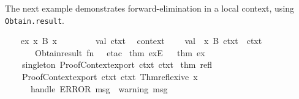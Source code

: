 \begin{isabellebody}
%
\isadelimproof
%
\endisadelimproof
%
\begin{isamarkuptext}%
\medskip The next example demonstrates forward-elimination in
  a local context, using \verb|Obtain.result|.%
\end{isamarkuptext}%
\isamarkuptrue%
\isamarkupfalse%
\isanewline
%
\isadelimproof
\ \ %
\endisadelimproof
%
\isatagproof
{}\isamarkupfalse%
\ ex{\isacharcolon}\ {\isachardoublequoteopen}{\isasymexists}x{\isachardot}\ B\ x{\isachardoublequoteclose}%
\endisatagproof
{\isafoldproof}%
%
\isadelimproof
\isanewline
%
\endisadelimproof
%
\isadelimML
\isanewline
\ \ %
\endisadelimML
%
\isatagML
{}\isamarkupfalse%
\ {\isacharverbatimopen}\isanewline
\ \ \ \ val\ ctxt{}\ {\isacharequal}\ %
\isaantiq
context%
\endisaantiq
{\isacharsemicolon}\isanewline
\ \ \ \ val\ {\isacharparenleft}{\isacharparenleft}{\isacharbrackleft}{\isacharparenleft}{\isacharunderscore}{\isacharcomma}\ x{\isacharparenright}{\isacharbrackright}{\isacharcomma}\ {\isacharbrackleft}B{\isacharbrackright}{\isacharparenright}{\isacharcomma}\ ctxt{}{\isacharparenright}\ {\isacharequal}\ ctxt{}\isanewline
\ \ \ \ \ \ {\isacharbar}{\isachargreater}\ Obtain{\isachardot}result\ {\isacharparenleft}fn\ {\isacharunderscore}\ {\isacharequal}{\isachargreater}\ etac\ %
\isaantiq
thm\ exE%
\endisaantiq
\ {}{\isacharparenright}\ {\isacharbrackleft}%
\isaantiq
thm\ ex%
\endisaantiq
{\isacharbrackright}{\isacharsemicolon}\isanewline
\ \ {\isacharverbatimclose}\isanewline
\ \ \isamarkupfalse%
\ {\isacharverbatimopen}\isanewline
\ \ \ \ singleton\ {\isacharparenleft}ProofContext{\isachardot}export\ ctxt{}\ ctxt{}{\isacharparenright}\ %
\isaantiq
thm\ refl%
\endisaantiq
{\isacharsemicolon}\isanewline
\ \ {\isacharverbatimclose}\isanewline
\ \ \isamarkupfalse%
\ {\isacharverbatimopen}\isanewline
\ \ \ \ ProofContext{\isachardot}export\ ctxt{}\ ctxt{}\ {\isacharbrackleft}Thm{\isachardot}reflexive\ x{\isacharbrackright}\isanewline
\ \ \ \ \ \ handle\ ERROR\ msg\ {\isacharequal}{\isachargreater}\ {\isacharparenleft}warning\ msg{\isacharsemicolon}\ {\isacharbrackleft}{\isacharbrackright}{\isacharparenright}{\isacharsemicolon}\isanewline
\ \ {\isacharverbatimclose}\isanewline
{}\isamarkupfalse%
%
\endisatagML
{\isafoldML}%
%
\isadelimML
\isanewline
%
\endisadelimML
%
\isadelimtheory
\isanewline
%
\endisadelimtheory
%
\isatagtheory
{}\isamarkupfalse%
%
\endisatagtheory
{\isafoldtheory}%
%
\isadelimtheory
\isanewline
%
\endisadelimtheory
\end{isabellebody}%
